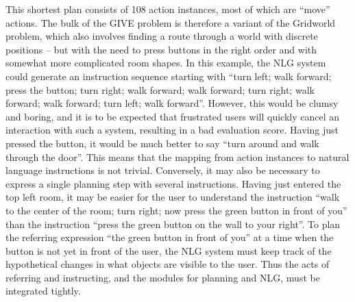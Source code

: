 This shortest plan consists of 108 action instances, most of which are
``move'' actions.  The bulk of the GIVE problem is therefore a variant
of the Gridworld problem, which also involves finding a route through
a world with discrete positions -- but with the need to press buttons
in the right order and with somewhat more complicated room shapes.  In
this example, the NLG system could generate an instruction sequence
starting with ``turn left; walk forward; press the button; turn right;
walk forward; walk forward; turn right; walk forward; walk forward;
turn left; walk forward''.  However, this would be clumsy and boring,
and it is to be expected that frustrated users will quickly cancel an
interaction with such a system, resulting in a bad evaluation score.
Having just pressed the button, it would be much better to say ``turn
around and walk through the door''.  This means that the mapping from
action instances to natural language instructions is not trivial.
Conversely, it may also be necessary to express a single planning step
with several instructions.  Having just entered the top left room, it
may be easier for the user to understand the instruction ``walk to the
center of the room; turn right; now press the green button in front of
you'' than the instruction ``press the green button on the wall to
your right''.  To plan the referring expression ``the green button in
front of you'' at a time when the button is not yet in front of the
user, the NLG system must keep track of the hypothetical changes in
what objects are visible to the user.  Thus the acts of referring and
instructing, and the modules for planning and NLG, must be integrated
tightly.




